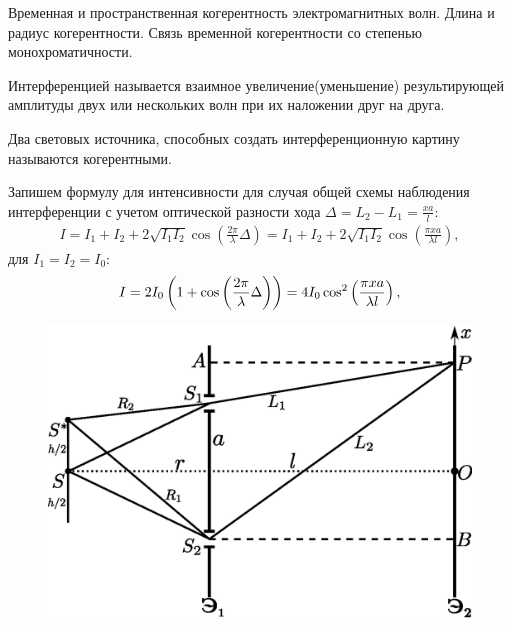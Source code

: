﻿\documentclass[__main__.tex]{subfiles}
\begin{document}
Временная и пространственная когерентность электромагнитных волн. Длина и радиус когерентности. Связь временной когерентности со степенью монохроматичности.\\ 

\begin{definition}
	Интерференцией называется взаимное увеличение(уменьшение) результирующей амплитуды двух или нескольких волн при их наложении друг на друга.
\end{definition}

\begin{definition}
	Два световых источника, способных создать интерференционную картину называются когерентными.
\end{definition}

Запишем формулу для интенсивности для случая общей схемы наблюдения интерференции с учетом оптической разности хода $\displaystyle \Delta = L_2 - L_1 = \frac{xa}{l}$:
\begin{gather*}
I = I_1 + I_2 + 2\sqrt{I_1 I_2}\cos\left(\frac{2\pi}{\lambda}\Delta\right) =
I_1 + I_2 + 2\sqrt{I_1 I_2}\cos\left(\frac{\pi x a}{\lambda l}\right),
\end{gather*}
для $I_1 = I_2 = I_0$:
\begin{gather}
\llabel{o-02-intensesch}
I = 2I_0\left(1 + \cos\left(\frac{2\pi}{\lambda}\Delta\right)\right) =
4I_0\cos^2\left(\frac{\pi xa}{\lambda l}\right),
\end{gather}

\begin{figure}
	\includegraphics[width=1\linewidth]{img/o-09}{}
	\caption{}
\end{figure}
\end{document}
